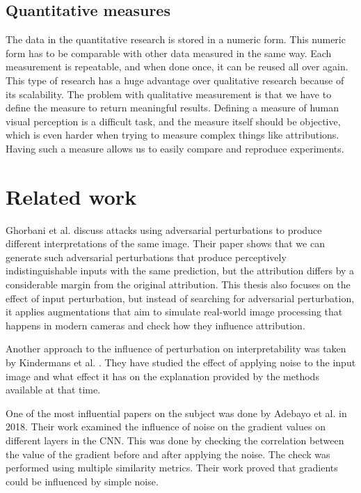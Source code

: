 \subsection{Quantitative measures}

The data in the quantitative research is stored in a numeric form. This numeric form has to be comparable with other data measured in the same way. Each measurement is repeatable, and when done once, it can be reused all over again. This type of research has a huge advantage over qualitative research because of its scalability. The problem with qualitative measurement is that we have to define the measure to return meaningful results. Defining a measure of human visual perception is a difficult task, and the measure itself should be objective, which is even harder when trying to measure complex things like attributions. Having such a measure allows us to easily compare and reproduce experiments.

\newpage

\section{Related work}

Ghorbani et al. \cite{ghorbani2019interpretation} discuss attacks using adversarial perturbations to produce different interpretations of the same image. Their paper shows that we can generate such adversarial perturbations that produce perceptively indistinguishable inputs with the same prediction, but the attribution differs by a considerable margin from the original attribution. This thesis also focuses on the effect of input perturbation, but instead of searching for adversarial perturbation, it applies augmentations that aim to simulate real-world image processing that happens in modern cameras and check how they influence attribution.

\vspace{\baselineskip}

Another approach to the influence of perturbation on interpretability was taken by Kindermans et al. \cite{kindermans2016investigating}. They have studied the effect of applying noise to the input image and what effect it has on the explanation provided by the methods available at that time.

\vspace{\baselineskip}

One of the most influential papers on the subject was done by Adebayo et al. \cite{adebayo2018sanity} in 2018. Their work examined the influence of noise on the gradient values on different layers in the CNN. This was done by checking the correlation between the value of the gradient before and after applying the noise. The check was performed using multiple similarity metrics. Their work proved that gradients could be influenced by simple noise.

